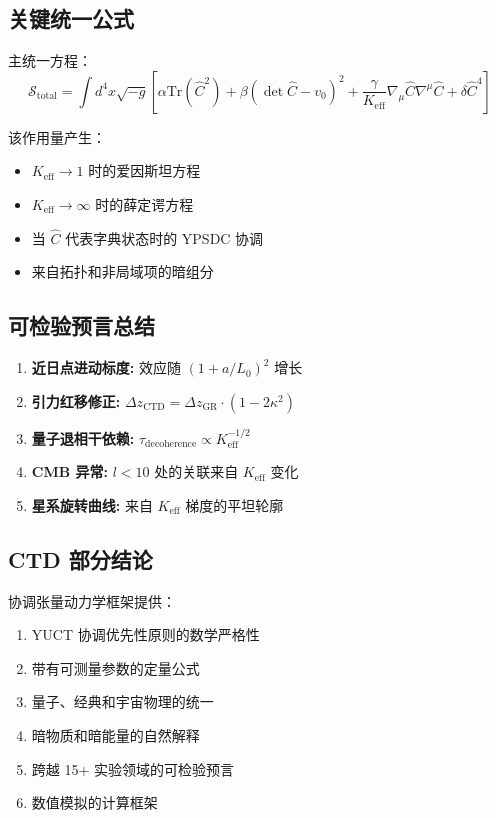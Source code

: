 \documentclass[11pt,a4paper]{article}
\begin{document}
	\subsection{关键统一公式}
	
	主统一方程：
	\[
	\boxed{\mathcal{S}_{\mathrm{total}} = \int d^{4}x \sqrt{-g} \left[ \alpha \mathrm{Tr}(\hat{C}^2) + \beta (\det\hat{C} - v_0)^2 + \frac{\gamma}{K_{\mathrm{eff}}} \nabla_\mu\hat{C}\nabla^\mu\hat{C} + \delta \hat{C}^4 \right]}
	\]
	
	该作用量产生：
	\begin{itemize}
		\item $K_{\mathrm{eff}} \to 1$ 时的爱因斯坦方程
		\item $K_{\mathrm{eff}} \to \infty$ 时的薛定谔方程
		\item 当 $\hat{C}$ 代表字典状态时的 YPSDC 协调
		\item 来自拓扑和非局域项的暗组分
	\end{itemize}
	
	\subsection{可检验预言总结}
	
	\begin{enumerate}
		\item \textbf{近日点进动标度:} 效应随 $(1 + a/L_0)^2$ 增长
		\item \textbf{引力红移修正:} $\Delta z_{\mathrm{CTD}} = \Delta z_{\mathrm{GR}} \cdot (1 - 2\kappa^2)$
		\item \textbf{量子退相干依赖:} $\tau_{\mathrm{decoherence}} \propto K_{\mathrm{eff}}^{-1/2}$
		\item \textbf{CMB 异常:} $l < 10$ 处的关联来自 $K_{\mathrm{eff}}$ 变化
		\item \textbf{星系旋转曲线:} 来自 $K_{\mathrm{eff}}$ 梯度的平坦轮廓
	\end{enumerate}
	
	\subsection{CTD 部分结论}
	
	协调张量动力学框架提供：
	\begin{enumerate}
		\item YUCT 协调优先性原则的数学严格性
		\item 带有可测量参数的定量公式
		\item 量子、经典和宇宙物理的统一
		\item 暗物质和暗能量的自然解释
		\item 跨越 15+ 实验领域的可检验预言
		\item 数值模拟的计算框架
	\end{enumerate}
	
\end{document}
